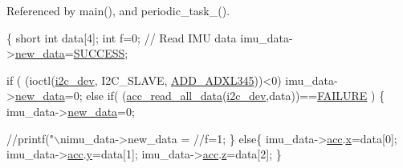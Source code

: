 Referenced by main(), and periodic\-\_\-task\-\_().


\begin{DoxyCode}
\{
  \textcolor{keywordtype}{short} \textcolor{keywordtype}{int} data[4];
  \textcolor{keywordtype}{int} f=0;
  \textcolor{comment}{// Read IMU data}
  imu\_data->\hyperlink{structIMU__DATA__STRUCT_a99924252176326418863e511d4fa437b}{new\_data}=\hyperlink{calibration_2calibration_8h_aa90cac659d18e8ef6294c7ae337f6b58}{SUCCESS};
  
  \textcolor{keywordflow}{if} ( (ioctl(\hyperlink{CommunicationV0_2communication_8c_a7751bd45ac1064efb35adf1f19c25db8}{i2c\_dev}, I2C\_SLAVE, \hyperlink{communication_2imu__functions_8h_a909f4a5773e20e672cdb4088e1cfa22f}{ADD\_ADXL345}))<0) 
        imu\_data->\hyperlink{structIMU__DATA__STRUCT_a99924252176326418863e511d4fa437b}{new\_data}=0;
  \textcolor{keywordflow}{else} \textcolor{keywordflow}{if}( (\hyperlink{group__acc_ga013bb5ed8a763883fc440549d2b1a6ce}{acc\_read\_all\_data}(\hyperlink{CommunicationV0_2communication_8c_a7751bd45ac1064efb35adf1f19c25db8}{i2c\_dev},data))==\hyperlink{calibration_2calibration_8h_a6d58f9ac447476b4e084d7ca383f5183}{FAILURE}
       )
  \{
        imu\_data->\hyperlink{structIMU__DATA__STRUCT_a99924252176326418863e511d4fa437b}{new\_data}=0;
        \textcolor{comment}{//printf("\(\backslash\)nimu\_data->new\_data = %
        \textcolor{comment}{//f=1;}
  \}
  \textcolor{keywordflow}{else}\{
    imu\_data->\hyperlink{structIMU__DATA__STRUCT_a448f284bf44eb503affda586ad5fa9d2}{acc}.\hyperlink{structDATA__XYZ_a54c1596e9f9969fd9c21e8458024ecfb}{x}=data[0];
    imu\_data->\hyperlink{structIMU__DATA__STRUCT_a448f284bf44eb503affda586ad5fa9d2}{acc}.\hyperlink{structDATA__XYZ_a94bbb1c889bf53eb6a5fffa2b39322cf}{y}=data[1];
    imu\_data->\hyperlink{structIMU__DATA__STRUCT_a448f284bf44eb503affda586ad5fa9d2}{acc}.\hyperlink{structDATA__XYZ_a69e89ab0ec6e5d72fc5d54f62cc07fb5}{z}=data[2];  
  \}
  
}
\end{DoxyCode}
